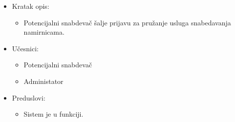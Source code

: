 
\begin{itemize}
	\item Kratak opis:
		\begin{itemize}
			\item Potencijalni snabdevač šalje prijavu za pružanje usluga snabedavanja namirnicama.
		\end{itemize}
	\item Učesnici:
		\begin{itemize}
			\item Potencijalni snabdevač
			\item Administator
		\end{itemize}	
	\item Preduslovi:
		\begin{itemize}
	       \item Sistem je u funkciji.
		\end{itemize}	


\end{itemize}
